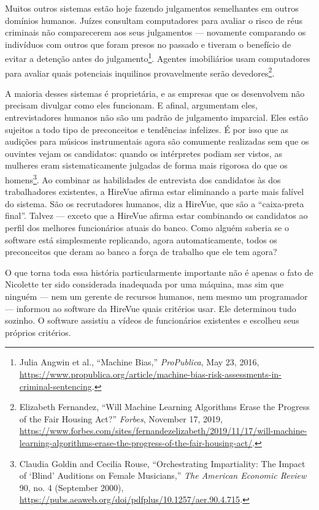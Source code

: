 Muitos outros sistemas estão hoje fazendo julgamentos semelhantes em outros 
domínios humanos. Juízes consultam computadores para avaliar o risco de réus 
criminais não comparecerem aos seus julgamentos --- novamente comparando os 
indivíduos com outros que foram presos no passado e tiveram o benefício de 
evitar a detenção antes do julgamento\footnote{Julia Angwin et al., ``Machine
Bias,'' \textit{ProPublica}, May 23, 2016, \url{https://www.propublica.org/article/machine-bias-risk-assessments-in-criminal-sentencing}.}. Agentes imobiliários usam computadores
para avaliar quais potenciais inquilinos provavelmente serão
devedores\footnote{Elizabeth Fernandez, ``Will Machine Learning Algorithms Erase
the Progress of the Fair Housing Act?'' \textit{Forbes}, November 17, 2019,
\url{https://www.forbes.com/sites/fernandezelizabeth/2019/11/17/will-machine-learning-algorithms-erase-the-progress-of-the-fair-housing-act/}.}.

A maioria desses sistemas é proprietária, e as empresas que os desenvolvem não 
precisam divulgar como eles funcionam. E afinal, argumentam eles, 
entrevistadores humanos não são um padrão de julgamento imparcial. Eles estão 
sujeitos a todo tipo de preconceitos e tendências infelizes. É por isso que as 
audições para músicos instrumentais agora são comumente realizadas sem que os 
ouvintes vejam os candidatos: quando os intérpretes podiam ser vistos, as 
mulheres eram sistematicamente julgadas de forma mais rigorosa do que os 
homens\footnote{Claudia Goldin and Cecilia Rouse, ``Orchestrating Impartiality:
The Impact of `Blind' Auditions on Female Musicians,'' \textit{The American
Economic Review} 90, no. 4 (September 2000), \url{https://pubs.aeaweb.org/doi/pdfplus/10.1257/aer.90.4.715}.}. Ao combinar as habilidades de entrevista dos candidatos às dos 
trabalhadores existentes, a HireVue afirma estar eliminando a parte mais falível 
do sistema. São os recrutadores humanos, diz a HireVue, que são a ``caixa-preta
final''. Talvez --- exceto que a HireVue afirma estar combinando os candidatos
ao perfil dos melhores funcionários atuais do banco. Como alguém saberia se o
software está simplesmente replicando, agora automaticamente, todos os
preconceitos que deram ao banco a força de trabalho que ele tem agora?

O que torna toda essa história particularmente importante não é apenas o fato de
Nicolette ter sido considerada inadequada por uma máquina, mas sim que ninguém
--- nem um gerente de recursos humanos, nem mesmo um programador --- informou ao
software da HireVue quais critérios usar. Ele determinou tudo sozinho. O 
software assistiu a vídeos de funcionários existentes e escolheu seus próprios 
critérios.

